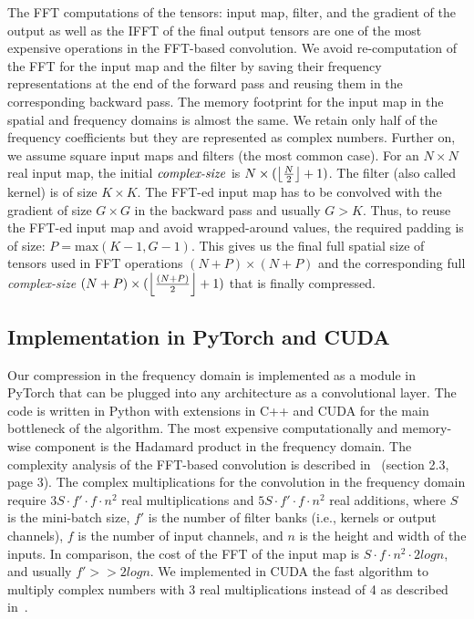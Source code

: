 The FFT computations of the tensors: input map, filter, and the gradient of the output as well as the IFFT of the final output tensors are one of the most expensive operations in the FFT-based convolution. We avoid re-computation of the FFT for the input map and the filter by saving their frequency representations at the end of the forward pass and reusing them in the corresponding backward pass. The memory footprint for the input map in the spatial and frequency domains is almost the same. We retain only half of the frequency coefficients but they are represented as complex numbers. Further on, we assume square input maps and filters (the most common case). For an $N \times N$ real input map, the initial $\text{\textit{complex-size}}$ is $N \times (\floor*{\frac{N}{2}} + 1)$. The filter (also called kernel) is of size $K \times K$. The FFT-ed input map has to be convolved with the gradient of size $G \times G$ in the backward pass and usually $G > K$. Thus, to reuse the FFT-ed input map and avoid wrapped-around values, the required padding is of size: $P=\text{max}(K - 1, G - 1)$. This gives us the final full spatial size of tensors used in FFT operations $(N + P) \times (N + P)$ and the corresponding full \textit{complex-size} $(N + P) \times (\floor*{\frac{(N + P)}{2}} + 1)$ that is finally compressed.

\subsection{Implementation in PyTorch and CUDA}
Our compression in the frequency domain is implemented as a module in PyTorch that can be plugged into any architecture as a convolutional layer. The code is written in Python with extensions in C++ and CUDA for the main bottleneck of the algorithm. The most expensive computationally and memory-wise component is the Hadamard product in the frequency domain. The complexity analysis of the FFT-based convolution is described in~\cite{mathieu2013fast} (section 2.3, page 3). The complex multiplications for the convolution in the frequency domain require $3S·f'·f·n^2$ real multiplications and $5S·f'·f·n^2$ real additions, where $S$ is the mini-batch size, $f'$ is the number of filter banks (i.e., kernels or output channels), $f$ is the number of input channels, and $n$ is the height and width of the inputs. In comparison, the cost of the FFT of the input map is $S·f·n^2·2 log  n$, and usually $f' >> 2 log n$. We implemented in CUDA the fast algorithm to multiply complex numbers with 3 real multiplications instead of 4 as described in~\cite{Lavin2016FastConvolution}.

